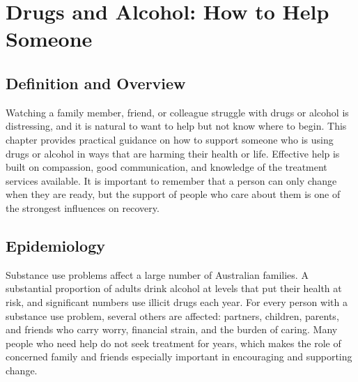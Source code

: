 \chapter{Drugs and Alcohol: How to Help Someone}

\section*{Definition and Overview}
Watching a family member, friend, or colleague struggle with drugs or alcohol is distressing, and it is natural to want to help but not know where to begin. This chapter provides practical guidance on how to support someone who is using drugs or alcohol in ways that are harming their health or life. Effective help is built on compassion, good communication, and knowledge of the treatment services available. It is important to remember that a person can only change when they are ready, but the support of people who care about them is one of the strongest influences on recovery.

\section*{Epidemiology}
Substance use problems affect a large number of Australian families. A substantial proportion of adults drink alcohol at levels that put their health at risk, and significant numbers use illicit drugs each year. For every person with a substance use problem, several others are affected: partners, children, parents, and friends who carry worry, financial strain, and the burden of caring. Many people who need help do not seek treatment for years, which makes the role of concerned family and friends especially important in encouraging and supporting change.

